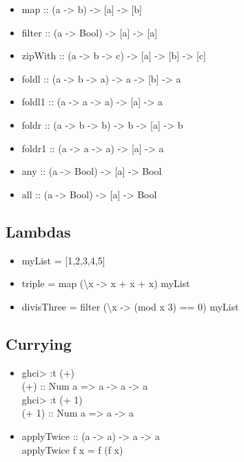 \documentclass{beamer}                  %
\newcommand{\srule}{
	\rule{\textwidth}{1pt}\\
}
\newlength{\subsecwidth}
\newenvironment{slide}{
	\begin{frame} %
	\settowidth{\subsecwidth}{\insertsubsection} %
	\ifthenelse{\dimtest{\subsecwidth}{<}{1pt}}{ %
		\frametitle{\insertsection\\             %
		\vspace{-1ex}                            %
		\color{fore}\srule                       %
		\par                                     %
		\vspace{-3ex}                            %
		}
	}{                                           %
		\frametitle{\insertsection\ -- \insertsubsection\\ %
		\vspace{-1ex}                            %
		\color{fore}\srule                       %
		\par                                     %
		\vspace{-3ex}                            %
		}
	}
	\Large                                       %
}{
	\end{frame}
}
\begin{document}
\begin{slide}
  \begin{itemize}
    \item map :: (a -> b) -> [a] -> [b]
    \item filter :: (a -> Bool) -> [a] -> [a]
    \item zipWith :: (a -> b -> c) -> [a] -> [b] -> [c]
    \item foldl :: (a -> b -> a) -> a -> [b] -> a
    \item foldl1 :: (a -> a -> a) -> [a] -> a
    \item foldr :: (a -> b -> b) -> b -> [a] -> b
    \item foldr1 :: (a -> a -> a) -> [a] -> a
    \item any :: (a -> Bool) -> [a] -> Bool
    \item all :: (a -> Bool) -> [a] -> Bool
  \end{itemize}
\end{slide}

\subsection{Lambdas}

\begin{slide}
  \begin{itemize}
    \item myList = [1,2,3,4,5]
    \item triple = map (\textbackslash x -> x + x + x) myList
    \item divisThree = filter (\textbackslash x -> (mod x 3) == 0) myList
  \end{itemize}
\end{slide}

\subsection{Currying}

\begin{slide}
  \begin{itemize}
    \item
      ghci> :t (+)\\
      (+) :: Num a => a -> a -> a\\
      ghci> :t (+ 1)\\
      (+ 1) :: Num a => a -> a\\
    \item
      applyTwice :: (a -> a) -> a -> a\\
      applyTwice f x = f (f x)
  \end{itemize}
\end{slide}
\end{document}
